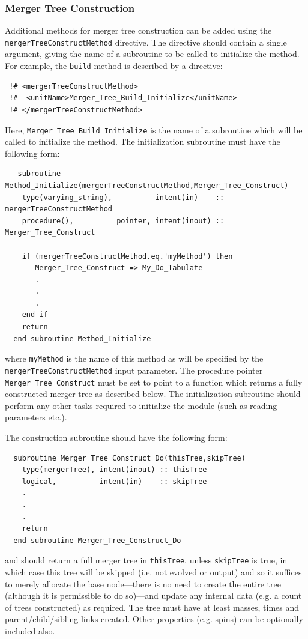 \subsubsection{Merger Tree Construction}\label{sec:MergerTreeConstruction}

Additional methods for merger tree construction can be added using the {\tt mergerTreeConstructMethod} directive. The directive should contain a single argument, giving the name of a subroutine to be called to initialize the method. For example, the {\tt build} method is described by a directive:
\begin{verbatim}
 !# <mergerTreeConstructMethod>
 !#  <unitName>Merger_Tree_Build_Initialize</unitName>
 !# </mergerTreeConstructMethod>
\end{verbatim}
Here, {\tt Merger\_Tree\_Build\_Initialize} is the name of a subroutine which will be called to initialize the method. The initialization subroutine must have the following form:
\begin{verbatim}
   subroutine Method_Initialize(mergerTreeConstructMethod,Merger_Tree_Construct)
    type(varying_string),          intent(in)    :: mergerTreeConstructMethod
    procedure(),          pointer, intent(inout) :: Merger_Tree_Construct
    
    if (mergerTreeConstructMethod.eq.'myMethod') then
       Merger_Tree_Construct => My_Do_Tabulate
       .
       .
       .
    end if
    return
  end subroutine Method_Initialize
\end{verbatim}
where {\tt myMethod} is the name of this method as will be specified by the {\tt mergerTreeConstructMethod} input parameter. The procedure pointer {\tt Merger\_Tree\_Construct} must be set to point to a function which returns a fully constructed merger tree as described below. The initialization subroutine should perform any other tasks required to initialize the module (such as reading parameters etc.).

The construction subroutine should have the following form:
\begin{verbatim}
  subroutine Merger_Tree_Construct_Do(thisTree,skipTree)
    type(mergerTree), intent(inout) :: thisTree
    logical,          intent(in)    :: skipTree
    .
    .
    .
    return
  end subroutine Merger_Tree_Construct_Do
\end{verbatim}
and should return a full merger tree in {\tt thisTree}, unless {\tt skipTree} is true, in which case this tree will be skipped (i.e. not evolved or output) and so it suffices to merely allocate the base node---there is no need to create the entire tree (although it is permissible to do so)---and update any internal data (e.g. a count of trees constructed) as required. The tree must have at least masses, times and parent/child/sibling links created. Other properties (e.g. spins) can be optionally included also.

